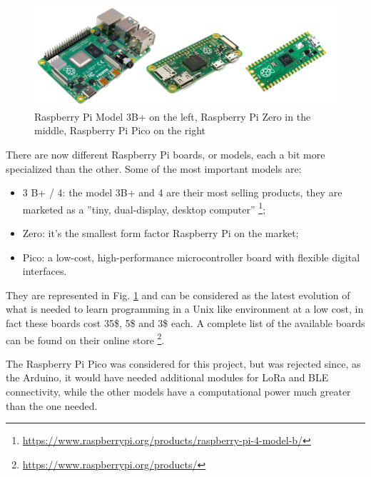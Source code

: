 		
		\begin{figure}
			\centering
			\includegraphics[width=\textwidth]{resources/img/chap3/raspberry_types}
			\caption{Raspberry Pi Model 3B+ on the left, Raspberry Pi Zero in the middle, Raspberry Pi Pico on the right}
			\label{img:raspberry_board}
		\end{figure}
		
		There are now different Raspberry Pi boards, or models, each a bit more specialized than the other.
		Some of the most important models are:
		\begin{itemize}[noitemsep]
			\item 3 B+ / 4: the model 3B+ and 4 are their most selling products, they are marketed as a ''tiny, dual-display, desktop computer'' \footnote{\url{https://www.raspberrypi.org/products/raspberry-pi-4-model-b/}};
			\item Zero: it's the smallest form factor Raspberry Pi on the market;
			\item Pico: a low-cost, high-performance microcontroller board with flexible digital interfaces.
		\end{itemize}
		
		They are represented in Fig. \ref{img:raspberry_board} and can be considered as the latest evolution of what is needed to learn programming in a Unix like environment at a low cost, in fact these boards cost 35\$, 5\$ and 3\$ each.
		A complete list of the available boards can be found on their online store \footnote{\url{https://www.raspberrypi.org/products/}}.
		
		The Raspberry Pi Pico was considered for this project, but was rejected since, as the Arduino, it would have needed additional modules for LoRa and BLE connectivity, while the other models have a computational power much greater than the one needed.
			

